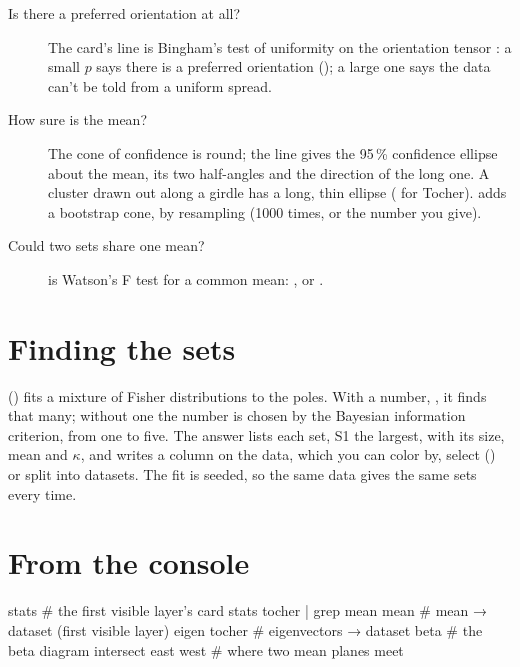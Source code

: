 \begin{description}
\item[Is there a preferred orientation at all?] The card's  line is
Bingham's test of uniformity on the orientation tensor \parencite{fisher1987}: a small $p$ says there is a
preferred orientation (); a large one says the data can't be told from a uniform spread.
\item[How sure is the mean?] The cone of confidence is round; the
 line gives the 95\,\% confidence ellipse about the mean, its two half-angles and the direction
of the long one. A cluster drawn out along a girdle has a long, thin ellipse
( for Tocher).  adds a bootstrap cone, by resampling (1000
times, or the number you give).
\item[Could two sets share one mean?]  is Watson's F test for a
common mean: , or .
\end{description}

\section{Finding the sets}\label{sec:sets}

 () fits a mixture of Fisher distributions to the poles. With a number, , it finds
that many; without one the number is chosen by the Bayesian information criterion, from one to five. The
answer lists each set, S1 the largest, with its size, mean and $\kappa$, and writes a  column on
the data, which you can color by, select () or split into datasets. The
fit is seeded, so the same data gives the same sets every time.

\section{From the console}\label{sec:stats-console}
%
%

\begin{codeblock}
stats                 # the first visible layer's card
stats tocher | grep mean
mean                  # mean → dataset (first visible layer)
eigen tocher          # eigenvectors → dataset
beta                  # the beta diagram
intersect east west   # where two mean planes meet
\end{codeblock}

